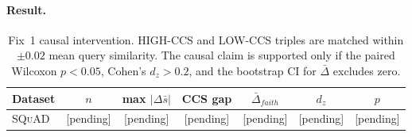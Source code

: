 \paragraph{Result.}
\begin{table}[t]
\centering
\caption{Fix~1 causal intervention. HIGH-CCS and LOW-CCS triples are
matched within $\pm 0.02$ mean query similarity. The causal claim is
supported only if the paired Wilcoxon $p<0.05$, Cohen's $d_z>0.2$, and
the bootstrap CI for $\bar{\Delta}$ excludes zero.}
\label{tab:fix01_causal}
\footnotesize
\begin{tabular}{lcccccc}
\toprule
Dataset & $n$ & max $|\Delta \bar{s}|$ & CCS gap & $\bar{\Delta}_{faith}$ & $d_z$ & $p$ \\
\midrule
\textsc{SQuAD} & {[}pending{]} & {[}pending{]} & {[}pending{]} & {[}pending{]} & {[}pending{]} & {[}pending{]} \\
\bottomrule
\end{tabular}
\end{table}

%
